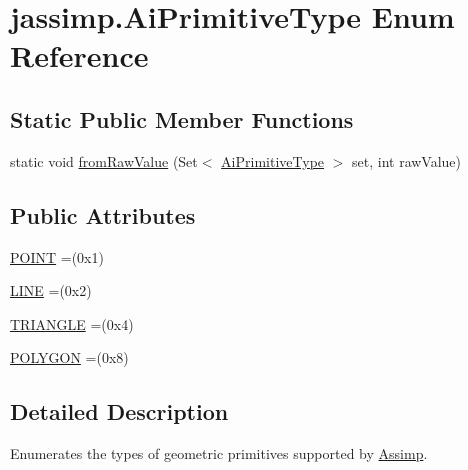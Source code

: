 \hypertarget{enumjassimp_1_1_ai_primitive_type}{\section{jassimp.\+Ai\+Primitive\+Type Enum Reference}
\label{enumjassimp_1_1_ai_primitive_type}
}
\subsection*{Static Public Member Functions}
\begin{DoxyCompactItemize}
\item 
static void \hyperlink{enumjassimp_1_1_ai_primitive_type_ac6ff67119d7041e180146def942e8b4a}{from\+Raw\+Value} (Set$<$ \hyperlink{enumjassimp_1_1_ai_primitive_type}{Ai\+Primitive\+Type} $>$ set, int raw\+Value)
\end{DoxyCompactItemize}
\subsection*{Public Attributes}
\begin{DoxyCompactItemize}
\item 
\hyperlink{enumjassimp_1_1_ai_primitive_type_abb7d44dafb7ac7521d817f164b4391ed}{P\+O\+I\+N\+T} =(0x1)
\item 
\hyperlink{enumjassimp_1_1_ai_primitive_type_a3ea249fd0e9fccf25ab4d7f5639dabe8}{L\+I\+N\+E} =(0x2)
\item 
\hyperlink{enumjassimp_1_1_ai_primitive_type_ad4e02dac72e2e204662d9cdc30795e38}{T\+R\+I\+A\+N\+G\+L\+E} =(0x4)
\item 
\hyperlink{enumjassimp_1_1_ai_primitive_type_a7a7e0a1a22ee3856ac23288c51ba53b5}{P\+O\+L\+Y\+G\+O\+N} =(0x8)
\end{DoxyCompactItemize}


\subsection{Detailed Description}
Enumerates the types of geometric primitives supported by \hyperlink{class_assimp}{Assimp}.

